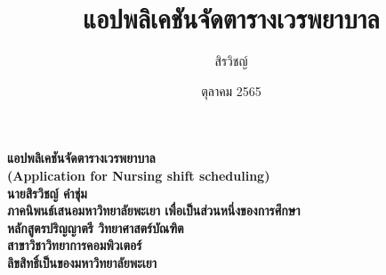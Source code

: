 \documentclass[a4paper,12pt]{upthesis}
\title{  						%
แอปพลิเคชันจัดตารางเวรพยาบาล
}
\author{สิรวิชญ์}{คำชุ่ม}
\date{ตุลาคม 2565}                                               %
\begin{document}

\thispagestyle{empty}
\begin{center} %
\Large{\textbf{แอปพลิเคชันจัดตารางเวรพยาบาล\\
(Application for Nursing shift scheduling)\\}}
\vspace{7cm}
\textbf{นายสิรวิชญ์ คำชุ่ม\\} %
\vspace{7cm}
\textbf{ภาคนิพนธ์เสนอมหาวิทยาลัยพะเยา เพื่อเป็นส่วนหนึ่งของการศึกษา\\
หลักสูตรปริญญาตรี วิทยาศาสตร์บัณฑิต\\
สาขาวิชาวิทยาการคอมพิวเตอร์\\
ลิขสิทธิ์เป็นของมหาวิทยาลัยพะเยา}
\end{center}



\newpage
\setcounter{page}{1}
\thispagestyle{empty}
\end{document}
